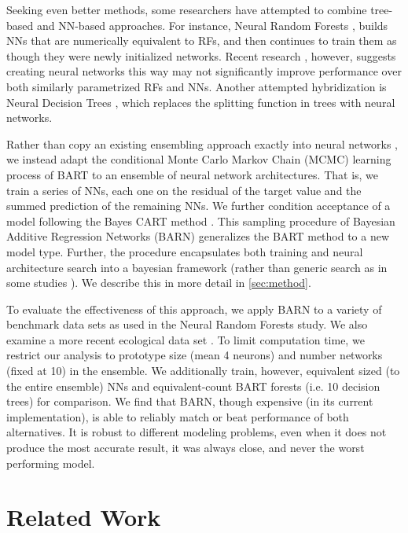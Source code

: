 \documentclass[12pt]{article}
\begin{document}
Seeking even better methods, some researchers have attempted to combine tree-based and NN-based approaches.  For instance, Neural Random Forests \cite{biau2019neural}, builds NNs that are numerically equivalent to RFs, and then continues to train them as though they were newly initialized networks.  Recent research \cite{vanboxel2021neural}, however, suggests creating neural networks this way may not significantly improve performance over both similarly parametrized RFs and NNs.  Another attempted hybridization is Neural Decision Trees \cite{balestriero2017neural}, which replaces the splitting function in trees with neural networks.

Rather than copy an existing ensembling approach exactly into neural networks \cite[for example]{biau2019neural}, we instead adapt the conditional Monte Carlo Markov Chain (MCMC) learning process of BART \cite{chipman2010bart} to an ensemble of neural network architectures.  That is, we train a series of NNs, each one on the residual of the target value and the summed prediction of the remaining NNs.  We further condition acceptance of a model following the Bayes CART method \cite{chipman1998bayesian}.  This sampling procedure of Bayesian Additive Regression Networks (BARN) generalizes the BART method to a new model type.  Further, the procedure encapsulates both training and neural architecture search into a bayesian framework (rather than generic search as in some studies \cite{idrissi2016genetic}).  We describe this in more detail in \autoref{sec:method}.

To evaluate the effectiveness of this approach, we apply BARN to a variety of benchmark data sets \cite{Dua:2019} as used in the Neural Random Forests \cite{biau2019neural} study.  We also examine a more recent ecological data set \cite{roman2022bayclump}.  To limit computation time, we restrict our analysis to prototype size (mean 4 neurons) and number networks (fixed at 10) in the ensemble.  We additionally train, however, equivalent sized (to the entire ensemble) NNs and equivalent-count BART forests (i.e. 10 decision trees) for comparison.  We find that BARN, though expensive (in its current implementation), is able to reliably match or beat performance of both alternatives.  It is robust to different modeling problems, even when it does not produce the most accurate result, it was always close, and never the worst performing model.

\section{Related Work}\label{sec:related}
\end{document}
